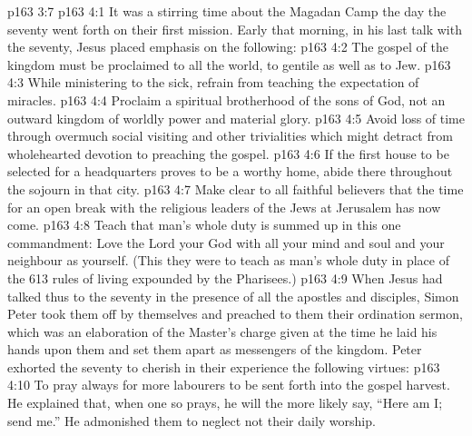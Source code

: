 \vs p163 3:7 
\vs p163 4:1 It was a stirring time about the Magadan Camp the day the seventy went forth on their first mission. Early that morning, in his last talk with the seventy, Jesus placed emphasis on the following:
\vs p163 4:2 \bibnobreakspace The gospel of the kingdom must be proclaimed to all the world, to gentile as well as to Jew.
\vs p163 4:3 \bibnobreakspace While ministering to the sick, refrain from teaching the expectation of miracles.
\vs p163 4:4 \bibnobreakspace Proclaim a spiritual brotherhood of the sons of God, not an outward kingdom of worldly power and material glory.
\vs p163 4:5 \bibnobreakspace Avoid loss of time through overmuch social visiting and other trivialities which might detract from wholehearted devotion to preaching the gospel.
\vs p163 4:6 \bibnobreakspace If the first house to be selected for a headquarters proves to be a worthy home, abide there throughout the sojourn in that city.
\vs p163 4:7 \bibnobreakspace Make clear to all faithful believers that the time for an open break with the religious leaders of the Jews at Jerusalem has now come.
\vs p163 4:8 \bibnobreakspace Teach that man’s whole duty is summed up in this one commandment: Love the Lord your God with all your mind and soul and your neighbour as yourself. (This they were to teach as man’s whole duty in place of the 613 rules of living expounded by the Pharisees.)
\vs p163 4:9 \pc When Jesus had talked thus to the seventy in the presence of all the apostles and disciples, Simon Peter took them off by themselves and preached to them their ordination sermon, which was an elaboration of the Master’s charge given at the time he laid his hands upon them and set them apart as messengers of the kingdom. Peter exhorted the seventy to cherish in their experience the following virtues:
\vs p163 4:10 \bibnobreakspace {} To pray always for more labourers to be sent forth into the gospel harvest. He explained that, when one so prays, he will the more likely say, “Here am I; send me.” He admonished them to neglect not their daily worship.
